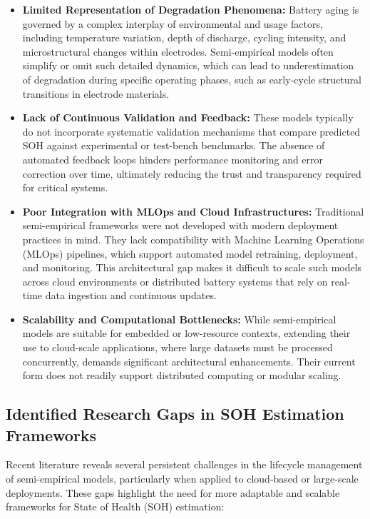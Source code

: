 \begin{itemize}
    \item \textbf{Limited Representation of Degradation Phenomena:} Battery aging is governed by a complex interplay of environmental and usage factors, including temperature variation, depth of discharge, cycling intensity, and microstructural changes within electrodes. Semi-empirical models often simplify or omit such detailed dynamics, which can lead to underestimation of degradation during specific operating phases, such as early-cycle structural transitions in electrode materials.
    
    \item \textbf{Lack of Continuous Validation and Feedback:} These models typically do not incorporate systematic validation mechanisms that compare predicted SOH against experimental or test-bench benchmarks. The absence of automated feedback loops hinders performance monitoring and error correction over time, ultimately reducing the trust and transparency required for critical systems.
    
    \item \textbf{Poor Integration with MLOps and Cloud Infrastructures:} Traditional semi-empirical frameworks were not developed with modern deployment practices in mind. They lack compatibility with Machine Learning Operations (MLOps) pipelines, which support automated model retraining, deployment, and monitoring. This architectural gap makes it difficult to scale such models across cloud environments or distributed battery systems that rely on real-time data ingestion and continuous updates.
    
    \item \textbf{Scalability and Computational Bottlenecks:} While semi-empirical models are suitable for embedded or low-resource contexts, extending their use to cloud-scale applications, where large datasets must be processed concurrently, demands significant architectural enhancements. Their current form does not readily support distributed computing or modular scaling.
\end{itemize}

\subsection*{Identified Research Gaps in SOH Estimation Frameworks}

Recent literature reveals several persistent challenges in the lifecycle management of semi-empirical models, particularly when applied to cloud-based or large-scale deployments. These gaps highlight the need for more adaptable and scalable frameworks for State of Health (SOH) estimation:


